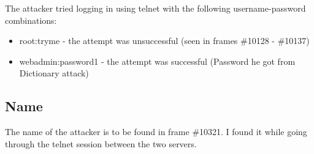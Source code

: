 The attacker tried logging in using telnet with the following username-password combinations:
\begin{itemize}
    \item root:tryme - the attempt was unsuccessful (seen in frames \#10128 - \#10137)
    \item webadmin:password1 - the attempt was successful (Password he got from Dictionary attack)
\end{itemize}

\subsection{Name}
The name of the attacker is to be found in frame \#10321.
I found it while going through the telnet session between the two servers.
